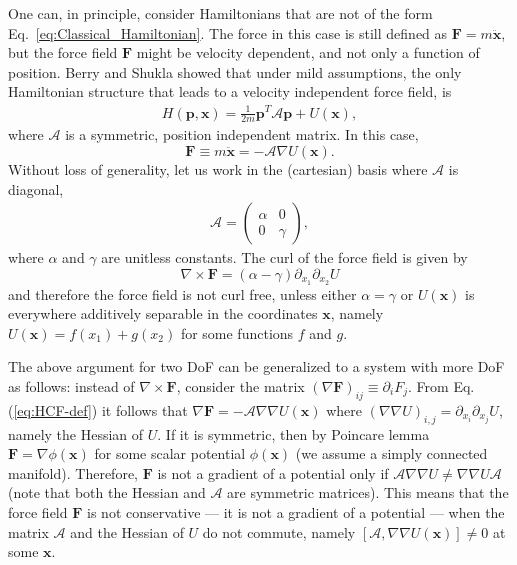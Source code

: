 One can, in principle, consider Hamiltonians that are not of the form Eq.~\ref{eq:Classical_Hamiltonian}. The force in this case is still defined as $\mathbf F = m \ddot{\mathbf x}$, but the force field $\mathbf F$ might be velocity dependent, and not only a function of position. Berry and Shukla showed \cite{berry2015hamiltonian} that  under mild assumptions, the only Hamiltonian structure that leads to a velocity independent force field, is 
\begin{eqnarray} \label{eq:CurlHamiltonians}
    H(\mathbf p,\mathbf x) = \frac{1}{2m}\mathbf p^T \mathcal{A} \mathbf p + U(\mathbf x),
\end{eqnarray}
where $\mathcal{A}$ is a symmetric, position independent matrix. In this case,
\begin{equation}
\mathbf F \equiv m\ddot{\mathbf{x}} = -\mathcal{A}\nabla U(\mathbf x).
\label{eq:HCF-def}
\end{equation}
Without loss of generality, let us work in the (cartesian) basis where $\mathcal{A}$ is diagonal, 
\begin{eqnarray}
    \mathcal{A} = \begin{pmatrix}
         \alpha & 0 \\
         0 & \gamma
    \end{pmatrix} ,
\end{eqnarray}
where $\alpha$ and $\gamma$ are unitless constants.
The curl of the force field is given by
\begin{equation}\label{eq:berry_curl}
    \nabla\times\mathbf F = \left( \alpha - \gamma \right) \partial_{x_1}\partial_{x_2}U 
\end{equation}
and therefore the force field is not curl free, unless either $\alpha=\gamma$ or $U(\mathbf x)$ is everywhere additively separable in the coordinates $\mathbf x$, namely $U(\mathbf x) = f(x_1)+g(x_2)$ for some functions $f$ and $g$. 

The above argument for two DoF can be generalized to a system with more DoF as follows: instead of $\nabla \times \mathbf F$, consider the matrix $(\nabla \mathbf F)_{ij}\equiv \partial_iF_j$. From Eq.(\ref{eq:HCF-def}) it follows that $\nabla \mathbf F = -\mathcal{A}\nabla\nabla U(\mathbf x)$ where $(\nabla\nabla U)_{i,j} = \partial_{x_i}\partial_{x_j}U$, namely the Hessian of $U$. If it is symmetric, then by Poincare lemma $\mathbf F = \nabla \phi (\mathbf x)$ for some scalar potential $\phi(\mathbf x)$ (we assume a simply connected manifold). Therefore, $\mathbf F$ is not a gradient of a potential only if $\mathcal{A}\nabla\nabla U\neq \nabla\nabla U \mathcal{A}$ (note that both the Hessian and $\mathcal{A}$ are symmetric matrices). This means that the force field $\mathbf F$ is not conservative --- it is not a gradient of a potential --- when the matrix $\mathcal{A}$ and the Hessian of $U$ do not commute, namely $[\mathcal{A},\nabla\nabla U(\mathbf{x})]\neq 0$ at some $\mathbf{x}$.  